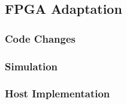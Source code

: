 
\subsection*{FPGA Adaptation}


\subsubsection*{Code Changes}


\subsubsection*{Simulation}


\subsubsection*{Host Implementation}